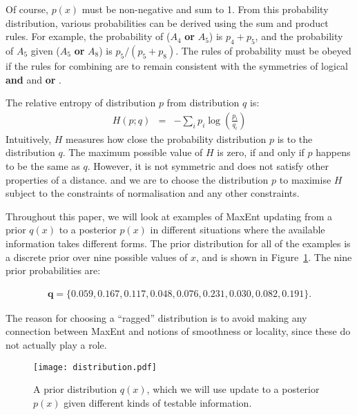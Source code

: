 \documentclass[a4paper, 11pt]{article}
\begin{document}
Of course, $p(x)$ must be non-negative and sum to 1.
From this probability distribution, various probabilities can be derived
using the sum and product rules. For example, the probability of
($A_4$ {\bf or} $A_5$) is $p_4 + p_5$, and the probability of $A_5$ given
($A_5$ {\bf or} $A_8$) is $p_5/(p_5 + p_8)$. The rules of probability must
be obeyed if the rules for combining are to remain consistent
with the symmetries of logical {\bf and} and {\bf or}
\citep{2010arXiv1008.4831K}.

The relative entropy of distribution $p$ from distribution $q$ is:
\begin{eqnarray}
H(p; q) &=& -\sum_i p_i \log\left(\frac{p_i}{q_i}\right) 
\end{eqnarray}
Intuitively, $H$ measures how close the probability distribution $p$ is
to the distribution $q$. The maximum possible value of $H$ is zero, if
and only if $p$ happens to be the same as $q$.
However, it is not symmetric and does not satisfy
other properties of a distance.
and we are to choose the distribution $p$ to maximise $H$ subject to the
constraints of normalisation and any other constraints.

Throughout this paper, we will look at examples of MaxEnt updating from a prior
$q(x)$ to a posterior $p(x)$ in different situations where the available
information takes different forms. The prior distribution for all of the
examples is a discrete prior over nine possible values of $x$, and is shown
in Figure~\ref{fig:distribution}. The nine prior probabilities are:

\begin{eqnarray}
\boldsymbol{q} = \{0.059, 0.167, 0.117, 0.048, 0.076, 0.231, 0.030, 0.082, 0.191\}.
\end{eqnarray}

The reason for choosing a ``ragged'' distribution is to avoid making any
connection between MaxEnt and notions of smoothness or locality, since these
do not actually play a role.

\begin{figure}
\begin{center}
\texttt{[image: distribution.pdf]}
\caption{A prior distribution $q(x)$, which we will use
update to a posterior $p(x)$ given different kinds of testable information.
\label{fig:distribution}}
\end{center}
\end{figure}
\end{document}

